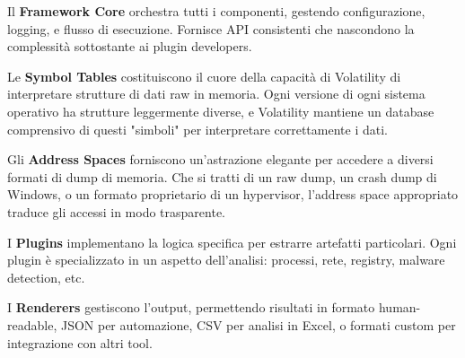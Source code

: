 Il \textbf{Framework Core} orchestra tutti i componenti, gestendo configurazione, logging, e flusso di esecuzione. Fornisce API consistenti che nascondono la complessità sottostante ai plugin developers.

Le \textbf{Symbol Tables} costituiscono il cuore della capacità di Volatility di interpretare strutture di dati raw in memoria. Ogni versione di ogni sistema operativo ha strutture leggermente diverse, e Volatility mantiene un database comprensivo di questi "simboli" per interpretare correttamente i dati.

Gli \textbf{Address Spaces} forniscono un'astrazione elegante per accedere a diversi formati di dump di memoria. Che si tratti di un raw dump, un crash dump di Windows, o un formato proprietario di un hypervisor, l'address space appropriato traduce gli accessi in modo trasparente.

I \textbf{Plugins} implementano la logica specifica per estrarre artefatti particolari. Ogni plugin è specializzato in un aspetto dell'analisi: processi, rete, registry, malware detection, etc.

I \textbf{Renderers} gestiscono l'output, permettendo risultati in formato human-readable, JSON per automazione, CSV per analisi in Excel, o formati custom per integrazione con altri tool.

